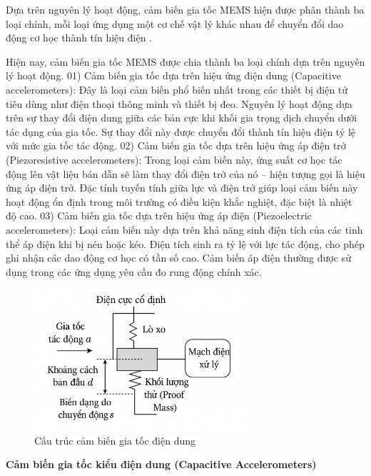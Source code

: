 Dựa trên nguyên lý hoạt động, cảm biến gia tốc MEMS hiện được phân thành ba loại chính, mỗi loại ứng dụng một cơ chế vật lý khác nhau để chuyển đổi dao động cơ học thành tín hiệu điện \cite{Acce}\cite{cambien}.

Hiện nay, cảm biến gia tốc MEMS được chia thành ba loại chính dựa trên nguyên lý hoạt động. 01) Cảm biến gia tốc dựa trên hiệu ứng điện dung (Capacitive accelerometers): 
Đây là loại cảm biến phổ biến nhất trong các thiết bị điện tử tiêu dùng như điện thoại thông minh 
và thiết bị đeo. Nguyên lý hoạt động dựa trên sự thay đổi điện dung giữa 
các bản cực khi khối gia trọng dịch chuyển dưới tác dụng của gia tốc. 
Sự thay đổi này được chuyển đổi thành tín hiệu điện tỷ lệ với mức gia tốc tác động. 
02) Cảm biến gia tốc dựa trên hiệu ứng áp điện trở (Piezoresistive accelerometers): 
Trong loại cảm biến này, ứng suất cơ học tác động lên vật liệu bán dẫn 
sẽ làm thay đổi điện trở của nó – hiện tượng gọi là hiệu ứng áp điện 
trở. Đặc tính tuyến tính giữa lực và điện trở giúp loại cảm biến này 
hoạt động ổn định trong môi trường có điều kiện khắc nghiệt, đặc biệt là 
nhiệt độ cao. 03) Cảm biến gia tốc dựa trên hiệu ứng áp điện 
(Piezoelectric accelerometers): Loại cảm biến này dựa trên khả năng 
sinh điện tích của các tinh thể áp điện khi bị nén hoặc kéo. Điện tích 
sinh ra tỷ lệ với lực tác động, cho phép ghi nhận các dao động cơ học 
có tần số cao. Cảm biến áp điện thường được sử dụng trong các ứng dụng 
yêu cầu đo rung động chính xác.



\begin{figure}[H]
	\centering
	\includegraphics[width=0.7\textwidth]{images/diendung.png}
	\vspace*{-7mm}
	\caption{Cấu trúc cảm biến gia tốc điện dung}
	\label{acce_mems}
\end{figure}




\textbf{Cảm biến gia tốc kiểu điện dung (Capacitive Accelerometers)}

